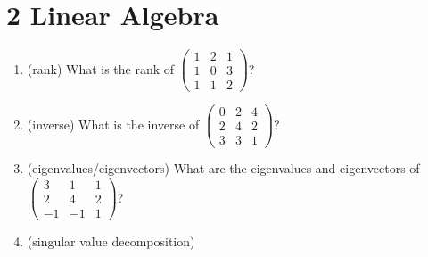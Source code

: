 \documentclass[12pt]{article}
\theoremstyle{definition}
\begin{document}
\section*{2 Linear Algebra}
\begin{enumerate}
    \item (rank)
    What is the rank of 
    $
    \begin{pmatrix}
        1 & 2 & 1\\
        1 & 0 & 3\\
        1 & 1 & 2
      \end{pmatrix}
    $?
    \item (inverse)
    What is the inverse of 
    $
    \begin{pmatrix}
        0 & 2 & 4\\
        2 & 4 & 2\\
        3 & 3 & 1
      \end{pmatrix}
    $?
    \item (eigenvalues/eigenvectors)
    What are the eigenvalues and eigenvectors of
    $
    \begin{pmatrix}
        3 & 1 & 1\\
        2 & 4 & 2\\
        -1 & -1 & 1
      \end{pmatrix}
    $?
    \item (singular value decomposition)
\end{enumerate}
\end{document}
